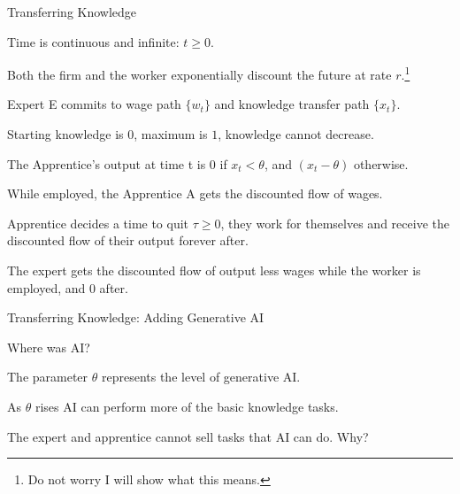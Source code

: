 \documentclass[aspectratio=169,usenames,dvipsnames]{beamer}
\newenvironment{wideitemize}{\itemize\addtolength{\itemsep}{10pt}}{\enditemize}
\begin{document}
\begin{frame}{Transferring Knowledge}
    \begin{wideitemize}
        \item Time is continuous and infinite: $t\geq 0$.
        \item Both the firm and the worker exponentially discount the future at rate $r$.\footnote{Do not worry I will show what this means.}
        \item Expert E commits to wage path $\{w_t\}$ and knowledge transfer path $\{x_t\}$.
        \begin{wideitemize}
            \item Starting knowledge is $0$, maximum is $1$, knowledge cannot decrease.
        \end{wideitemize}
        \item The Apprentice's output at time t is $0$ if $x_t<\theta $, and $(x_t-\theta)$ otherwise.
        \item While employed, the Apprentice A gets the discounted flow of wages.
            \item Apprentice decides a time to quit $\tau\geq 0$, they work for themselves and receive the discounted flow of their output forever after.
           \item The expert gets the discounted flow of output less wages while the worker is employed, and 0 after.

    \end{wideitemize}
\end{frame}


\begin{frame}{Transferring Knowledge: Adding Generative AI}

\begin{wideitemize}
    \item Where was AI?
    \item The parameter $\theta$ represents the level of generative AI.
    \item As $\theta$ rises AI can perform more of the basic knowledge tasks.
    \item The expert and apprentice cannot sell tasks that AI can do. Why?
\end{wideitemize}
    
\end{frame}
\end{document}
